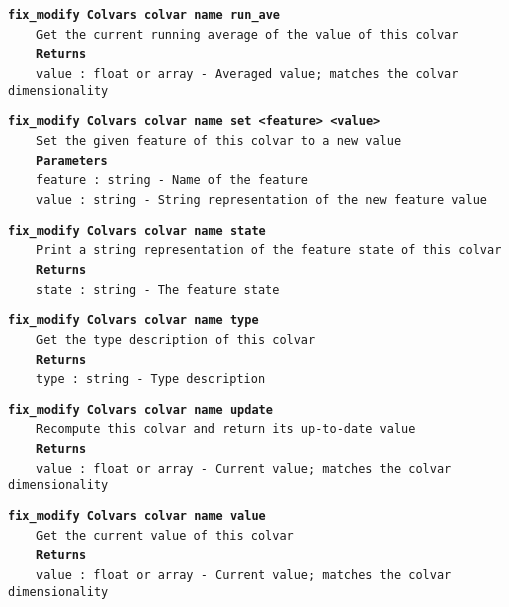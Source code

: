 \begin{mdexampleinput}{}
\texttt{\textbf{fix\_modify Colvars colvar name run\_ave}}
\\
\-~~~~\texttt{Get the current running average of the value of this colvar}
\\
\-~~~~\texttt{\textbf{Returns}}
\\
\-~~~~\texttt{value : float or array - Averaged value; matches the colvar dimensionality}
\end{mdexampleinput}
\begin{mdexampleinput}{}
\texttt{\textbf{fix\_modify Colvars colvar name set <feature> <value>}}
\\
\-~~~~\texttt{Set the given feature of this colvar to a new value}
\\
\-~~~~\texttt{\textbf{Parameters}}
\\
\-~~~~\texttt{feature : string - Name of the feature}
\\
\-~~~~\texttt{value : string - String representation of the new feature value}
\end{mdexampleinput}
\begin{mdexampleinput}{}
\texttt{\textbf{fix\_modify Colvars colvar name state}}
\\
\-~~~~\texttt{Print a string representation of the feature state of this colvar}
\\
\-~~~~\texttt{\textbf{Returns}}
\\
\-~~~~\texttt{state : string - The feature state}
\end{mdexampleinput}
\begin{mdexampleinput}{}
\texttt{\textbf{fix\_modify Colvars colvar name type}}
\\
\-~~~~\texttt{Get the type description of this colvar}
\\
\-~~~~\texttt{\textbf{Returns}}
\\
\-~~~~\texttt{type : string - Type description}
\end{mdexampleinput}
\begin{mdexampleinput}{}
\texttt{\textbf{fix\_modify Colvars colvar name update}}
\\
\-~~~~\texttt{Recompute this colvar and return its up-to-date value}
\\
\-~~~~\texttt{\textbf{Returns}}
\\
\-~~~~\texttt{value : float or array - Current value; matches the colvar dimensionality}
\end{mdexampleinput}
\begin{mdexampleinput}{}
\texttt{\textbf{fix\_modify Colvars colvar name value}}
\\
\-~~~~\texttt{Get the current value of this colvar}
\\
\-~~~~\texttt{\textbf{Returns}}
\\
\-~~~~\texttt{value : float or array - Current value; matches the colvar dimensionality}
\end{mdexampleinput}
